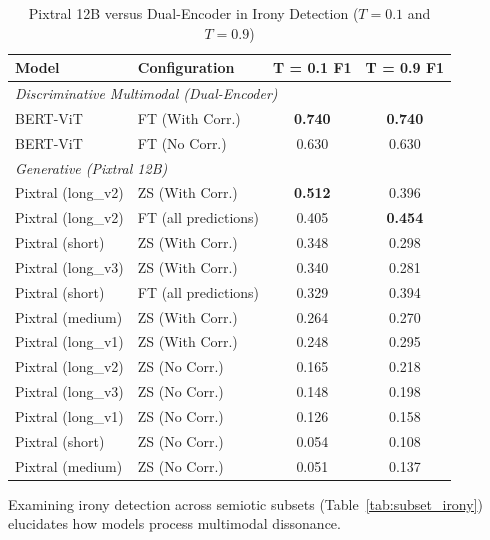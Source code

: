 \begin{table}[!t]
\centering
\caption{Pixtral 12B versus Dual-Encoder in Irony Detection ($T=0.1$ and $T=0.9$)}
\label{tab:irony_pixtral}
\footnotesize
\renewcommand{\arraystretch}{0.92}
\begin{tabular}{l l c c}
\hline
\textbf{Model} & \textbf{Configuration} & \textbf{T = 0.1 F1} & \textbf{T = 0.9 F1} \\
\hline
\multicolumn{4}{l}{\textit{Discriminative Multimodal (Dual-Encoder)}} \\
BERT-ViT & FT (With Corr.) & \textbf{0.740} & \textbf{0.740} \\
BERT-ViT & FT (No Corr.) & 0.630 & 0.630 \\
\hline
\multicolumn{4}{l}{\textit{Generative (Pixtral 12B)}} \\
Pixtral (long\_v2) & ZS (With Corr.) & \textbf{0.512} & 0.396 \\
Pixtral (long\_v2) & FT (all predictions) & 0.405 & \textbf{0.454} \\
Pixtral (short) & ZS (With Corr.) & 0.348 & 0.298 \\
Pixtral (long\_v3) & ZS (With Corr.) & 0.340 & 0.281 \\
Pixtral (short) & FT (all predictions) & 0.329 & 0.394 \\
Pixtral (medium) & ZS (With Corr.) & 0.264 & 0.270 \\
Pixtral (long\_v1) & ZS (With Corr.) & 0.248 & 0.295 \\
Pixtral (long\_v2) & ZS (No Corr.) & 0.165 & 0.218 \\
Pixtral (long\_v3) & ZS (No Corr.) & 0.148 & 0.198 \\
Pixtral (long\_v1) & ZS (No Corr.) & 0.126 & 0.158 \\
Pixtral (short) & ZS (No Corr.) & 0.054 & 0.108 \\
Pixtral (medium) & ZS (No Corr.) & 0.051 & 0.137 \\
\hline
\end{tabular}
\end{table}

Examining irony detection across semiotic subsets (Table~\ref{tab:subset_irony}) elucidates how models process multimodal dissonance.

